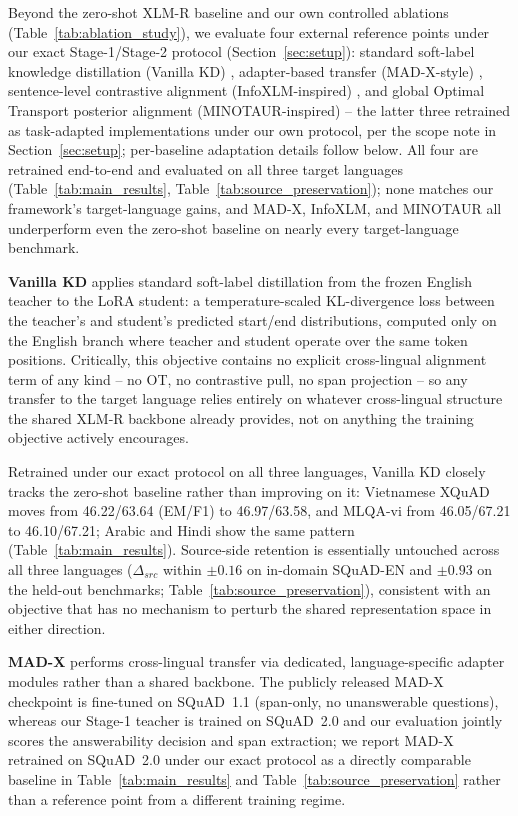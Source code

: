 \documentclass[11pt]{article}
\begin{document}
Beyond the zero-shot XLM-R baseline and our own controlled ablations (Table~\ref{tab:ablation_study}), we evaluate four external reference points under our exact Stage-1/Stage-2 protocol (Section~\ref{sec:setup}): standard soft-label knowledge distillation (Vanilla KD) \citep{hinton2015distillingknowledgeneuralnetwork}, adapter-based transfer (MAD-X-style) \citep{pfeiffer-etal-2020-mad}, sentence-level contrastive alignment (InfoXLM-inspired) \citep{chi-etal-2021-infoxlm}, and global Optimal Transport posterior alignment (MINOTAUR-inspired) \citep{sherborne-etal-2023-optimal} -- the latter three retrained as task-adapted implementations under our own protocol, per the scope note in Section~\ref{sec:setup}; per-baseline adaptation details follow below. All four are retrained end-to-end and evaluated on all three target languages (Table~\ref{tab:main_results}, Table~\ref{tab:source_preservation}); none matches our framework's target-language gains, and MAD-X, InfoXLM, and MINOTAUR all underperform even the zero-shot baseline on nearly every target-language benchmark.

\textbf{Vanilla KD}
\label{sec:appendix_vanilla_kd}
\citep{hinton2015distillingknowledgeneuralnetwork} applies standard soft-label distillation from the frozen English teacher to the LoRA student: a temperature-scaled KL-divergence loss between the teacher's and student's predicted start/end distributions, computed only on the English branch where teacher and student operate over the same token positions. Critically, this objective contains no explicit cross-lingual alignment term of any kind -- no OT, no contrastive pull, no span projection -- so any transfer to the target language relies entirely on whatever cross-lingual structure the shared XLM-R backbone already provides, not on anything the training objective actively encourages.

Retrained under our exact protocol on all three languages, Vanilla KD closely tracks the zero-shot baseline rather than improving on it: Vietnamese XQuAD moves from 46.22/63.64 (EM/F1) to 46.97/63.58, and MLQA-vi from 46.05/67.21 to 46.10/67.21; Arabic and Hindi show the same pattern (Table~\ref{tab:main_results}). Source-side retention is essentially untouched across all three languages ($\Delta_{src}$ within $\pm0.16$ on in-domain SQuAD-EN and $\pm0.93$ on the held-out benchmarks; Table~\ref{tab:source_preservation}), consistent with an objective that has no mechanism to perturb the shared representation space in either direction.

\textbf{MAD-X}
\label{sec:appendix_madx}
\citep{pfeiffer-etal-2020-mad} performs cross-lingual transfer via dedicated, language-specific adapter modules rather than a shared backbone. The publicly released MAD-X checkpoint is fine-tuned on SQuAD~1.1 (span-only, no unanswerable questions), whereas our Stage-1 teacher is trained on SQuAD~2.0 and our evaluation jointly scores the answerability decision and span extraction; we report MAD-X retrained on SQuAD~2.0 under our exact protocol as a directly comparable baseline in Table~\ref{tab:main_results} and Table~\ref{tab:source_preservation} rather than a reference point from a different training regime.
\end{document}
